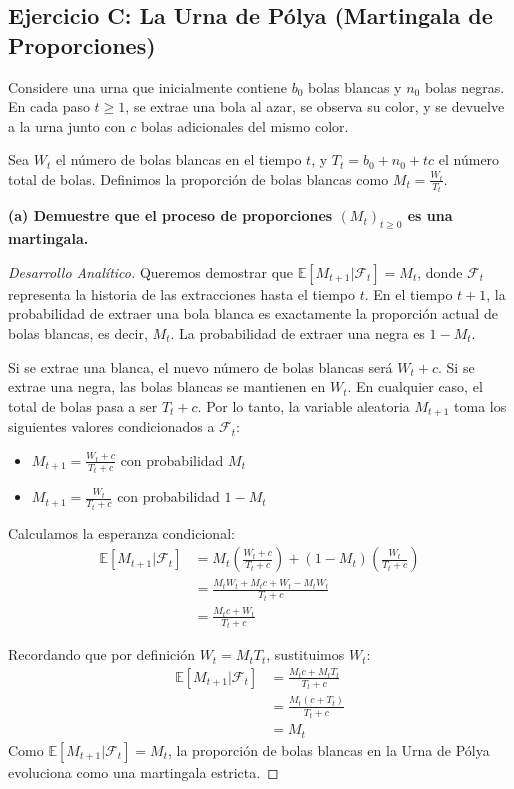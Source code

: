 \documentclass[12pt, a4paper]{article}
\begin{document}
\vspace{0.5cm}

\subsection{Ejercicio C: La Urna de Pólya (Martingala de Proporciones)}
Considere una urna que inicialmente contiene $b_0$ bolas blancas y $n_0$ bolas negras. En cada paso $t \ge 1$, se extrae una bola al azar, se observa su color, y se devuelve a la urna junto con $c$ bolas adicionales del mismo color. 

Sea $W_t$ el número de bolas blancas en el tiempo $t$, y $T_t = b_0 + n_0 + tc$ el número total de bolas. Definimos la proporción de bolas blancas como $M_t = \frac{W_t}{T_t}$.

\vspace{0.3cm}
\noindent \textbf{(a) Demuestre que el proceso de proporciones $(M_t)_{t \ge 0}$ es una martingala.}

\begin{proof}[Desarrollo Analítico]
Queremos demostrar que $\mathbb{E}[M_{t+1} | \mathcal{F}_t] = M_t$, donde $\mathcal{F}_t$ representa la historia de las extracciones hasta el tiempo $t$.
En el tiempo $t+1$, la probabilidad de extraer una bola blanca es exactamente la proporción actual de bolas blancas, es decir, $M_t$. La probabilidad de extraer una negra es $1 - M_t$.

Si se extrae una blanca, el nuevo número de bolas blancas será $W_t + c$. Si se extrae una negra, las bolas blancas se mantienen en $W_t$. En cualquier caso, el total de bolas pasa a ser $T_t + c$.
Por lo tanto, la variable aleatoria $M_{t+1}$ toma los siguientes valores condicionados a $\mathcal{F}_t$:
\begin{itemize}
    \item $M_{t+1} = \frac{W_t + c}{T_t + c}$ con probabilidad $M_t$
    \item $M_{t+1} = \frac{W_t}{T_t + c}$ con probabilidad $1 - M_t$
\end{itemize}

Calculamos la esperanza condicional:
\begin{align*}
    \mathbb{E}[M_{t+1} | \mathcal{F}_t] &= M_t \left( \frac{W_t + c}{T_t + c} \right) + (1 - M_t) \left( \frac{W_t}{T_t + c} \right) \\
    &= \frac{M_t W_t + M_t c + W_t - M_t W_t}{T_t + c} \\
    &= \frac{M_t c + W_t}{T_t + c}
\end{align*}

Recordando que por definición $W_t = M_t T_t$, sustituimos $W_t$:
\begin{align*}
    \mathbb{E}[M_{t+1} | \mathcal{F}_t] &= \frac{M_t c + M_t T_t}{T_t + c} \\
    &= \frac{M_t (c + T_t)}{T_t + c} \\
    &= M_t
\end{align*}
Como $\mathbb{E}[M_{t+1} | \mathcal{F}_t] = M_t$, la proporción de bolas blancas en la Urna de Pólya evoluciona como una martingala estricta.
\end{proof}
\end{document}

